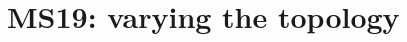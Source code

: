 \documentclass[11pt]{book}
\begin{document}
\clearpage

\section{MS19: varying the topology}

%
\footnotesize
\setlength{\bibsep}{0.0pt}

\end{document}
